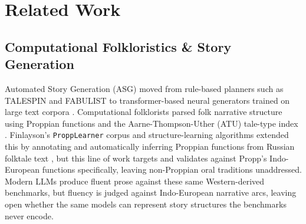 \documentclass[pdflatex,sn-mathphys-num]{sn-jnl}%
\newcommand{\juhoansi}{\mbox{Ju\textbar{}'hoansi}}%
\theoremstyle{thmstyleone}%
\theoremstyle{thmstyletwo}%
\theoremstyle{thmstylethree}%
\begin{document}
%
\section{Related Work}\label{sec:related}

\subsection{Computational Folkloristics \& Story Generation}
Automated Story Generation (ASG) moved from rule-based planners such as TALESPIN and FABULIST to transformer-based neural generators trained on large text corpora \cite{naveed2023comprehensive}. Computational folklorists parsed folk narrative structure using Proppian functions and the Aarne-Thompson-Uther (ATU) tale-type index \cite{propp1928morphology}. Finlayson's \texttt{ProppLearner} corpus and structure-learning algorithms extended this by annotating and automatically inferring Proppian functions from Russian folktale text \cite{finlayson2012learning,finlayson2017propplearner}, but this line of work targets and validates against Propp's Indo-European functions specifically, leaving non-Proppian oral traditions unaddressed. Modern LLMs produce fluent prose against these same Western-derived benchmarks, but fluency is judged against Indo-European narrative arcs, leaving open whether the same models can represent story structures the benchmarks never encode.
\end{document}
